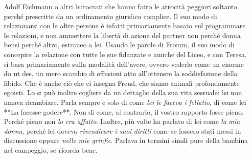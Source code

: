 \documentclass[a4paper,12pt]{article}
\begin{document}
\begin{dialogue}
Adolf Eichmann o altri burocrati che hanno fatto le atrocità peggiori soltanto
perché prescritte da un ordinamento giuridico complice. Il suo modo di
relazionarsi con le altre persone è infatti primariamente basato sul programmare
le relazioni, e non ammettere la libertà di azione del partner non perché donna
bensì perché altro, estraneo a lei. Usando le parole di Fromm, il suo modo di
concepire la relazione con tutte le sue fidanzate e amiche del Liceo, e con
Teresa, si basa primariamente sulla modalità dell’avere, ovvero vederlo come un
enorme do ut des, un mero scambio di effusioni atto all’ottenere la
soddisfazione della libido. Che è anche ciò che ci insegna Freud, che siamo
animali profondamente egoisti. Lo si può inoltre cogliere da un dettaglio della
sua vita sessuale: lei non amava ricambiare. Parla sempre e solo di come \emph{lei
le faceva i fellatio}, di come lei **La facesse godere**. Non di come, al
contrario, il vostro rapporto fosse pieno. Perché pieno non \emph{lo era
affatto}.
Inoltre, più volte ha parlato di lei come \emph{la mia donna}, perché lei doveva
\emph{rivendicare i suoi diritti} come se fossero stati messi in discussione
oppure \emph{nelle mie grinfie}. Parlava in termini simili pure della bambina nel campeggio, se ricorda bene.

\end{dialogue}
\end{document}
